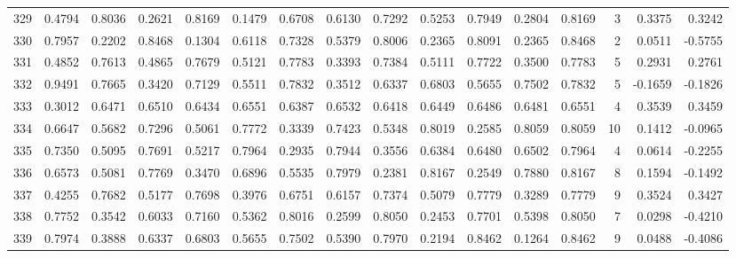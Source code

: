 \begin{tabular}{lrrrrrrrrrrrrrrr}
329 &      0.4794 &  0.8036 &  0.2621 &  0.8169 &  0.1479 &  0.6708 &  0.6130 &  0.7292 &  0.5253 &  0.7949 &   0.2804 &     0.8169 &      3 &                    0.3375 &                     0.3242 \\
330 &      0.7957 &  0.2202 &  0.8468 &  0.1304 &  0.6118 &  0.7328 &  0.5379 &  0.8006 &  0.2365 &  0.8091 &   0.2365 &     0.8468 &      2 &                    0.0511 &                    -0.5755 \\
331 &      0.4852 &  0.7613 &  0.4865 &  0.7679 &  0.5121 &  0.7783 &  0.3393 &  0.7384 &  0.5111 &  0.7722 &   0.3500 &     0.7783 &      5 &                    0.2931 &                     0.2761 \\
332 &      0.9491 &  0.7665 &  0.3420 &  0.7129 &  0.5511 &  0.7832 &  0.3512 &  0.6337 &  0.6803 &  0.5655 &   0.7502 &     0.7832 &      5 &                   -0.1659 &                    -0.1826 \\
333 &      0.3012 &  0.6471 &  0.6510 &  0.6434 &  0.6551 &  0.6387 &  0.6532 &  0.6418 &  0.6449 &  0.6486 &   0.6481 &     0.6551 &      4 &                    0.3539 &                     0.3459 \\
334 &      0.6647 &  0.5682 &  0.7296 &  0.5061 &  0.7772 &  0.3339 &  0.7423 &  0.5348 &  0.8019 &  0.2585 &   0.8059 &     0.8059 &     10 &                    0.1412 &                    -0.0965 \\
335 &      0.7350 &  0.5095 &  0.7691 &  0.5217 &  0.7964 &  0.2935 &  0.7944 &  0.3556 &  0.6384 &  0.6480 &   0.6502 &     0.7964 &      4 &                    0.0614 &                    -0.2255 \\
336 &      0.6573 &  0.5081 &  0.7769 &  0.3470 &  0.6896 &  0.5535 &  0.7979 &  0.2381 &  0.8167 &  0.2549 &   0.7880 &     0.8167 &      8 &                    0.1594 &                    -0.1492 \\
337 &      0.4255 &  0.7682 &  0.5177 &  0.7698 &  0.3976 &  0.6751 &  0.6157 &  0.7374 &  0.5079 &  0.7779 &   0.3289 &     0.7779 &      9 &                    0.3524 &                     0.3427 \\
338 &      0.7752 &  0.3542 &  0.6033 &  0.7160 &  0.5362 &  0.8016 &  0.2599 &  0.8050 &  0.2453 &  0.7701 &   0.5398 &     0.8050 &      7 &                    0.0298 &                    -0.4210 \\
339 &      0.7974 &  0.3888 &  0.6337 &  0.6803 &  0.5655 &  0.7502 &  0.5390 &  0.7970 &  0.2194 &  0.8462 &   0.1264 &     0.8462 &      9 &                    0.0488 &                    -0.4086 \\

\end{tabular}
